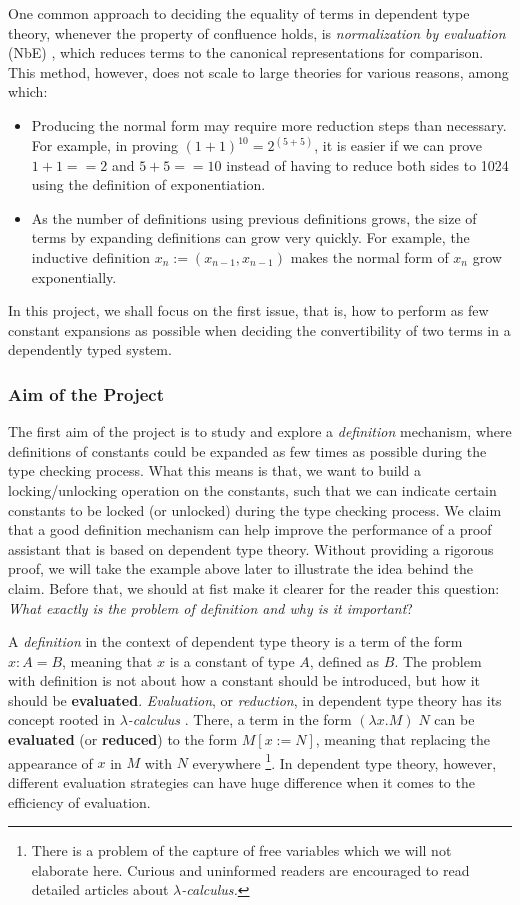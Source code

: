 \documentclass{article}
\theoremstyle{remark}
\begin{document}
One common approach to deciding the equality of terms in dependent type theory, whenever the property of confluence holds, is \textit{normalization by evaluation} (NbE) \cite{berger1998normalization}, which reduces terms to the canonical representations for comparison. This method, however, does not scale to large theories for various reasons, among which:
\begin{itemize}
\item Producing the normal form may require more reduction steps than necessary. For example, in proving $(1 + 1) ^ {10} = 2 ^{(5 + 5)}$, it is easier if we can prove $1 + 1 == 2$ and $5 + 5 == 10$ instead of having to reduce both sides to 1024 using the definition of exponentiation.
\item As the number of definitions using previous definitions grows, the size of terms by expanding definitions can grow very quickly. For example, the inductive definition $x_n := (x_{n-1}, x_{n-1})$ makes the normal form of $x_{n}$ grow exponentially.
\end{itemize}
In this project, we shall focus on the first issue, that is, how to perform as few constant expansions as possible when deciding the convertibility of two terms in a dependently typed system. 

\subsubsection{Aim of the Project}
The first aim of the project is to study and explore a \emph{definition} mechanism, where definitions of constants could be expanded as few times as possible during the type checking process. What this means is that, we want to build a locking/unlocking operation on the constants, such that we can indicate certain constants to be locked (or unlocked) during the type checking process. We claim that a good definition mechanism can help improve the performance of a proof assistant that is based on dependent type theory. Without providing a rigorous proof, we will take the example above later to illustrate the idea behind the claim. Before that, we should at fist make it clearer for the reader this question: \emph{What exactly is the problem of definition and why is it important}?

A \emph{definition} in the context of dependent type theory is a term of the form $x : A = B$, meaning that $x$ is a constant of type $A$, defined as $B$. The problem with definition is not about how a constant should be introduced, but how it should be \textbf{evaluated}. \emph{Evaluation}, or \emph{reduction}, in dependent type theory has its concept rooted in \emph{$\lambda$-calculus} \cite{barendregt1984lambda}. There, a term in the form $(\lambda x . M) \;N$ can be \textbf{evaluated} (or \textbf{reduced}) to the form $M[x := N]$, meaning that replacing the appearance of $x$ in $M$ with $N$ everywhere \footnote{There is a problem of the capture of free variables which we will not elaborate here. Curious and uninformed readers are encouraged to read detailed articles about \emph{$\lambda$-calculus.}}. In dependent type theory, however, different evaluation strategies can have huge difference when it comes to the efficiency of evaluation. 
\end{document}
